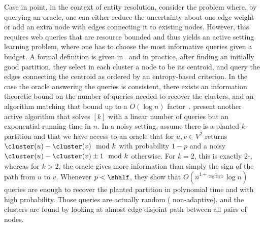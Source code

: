 
Case in point, in the context of entity resolution, \textcite{activeCoref07} consider the \pcc{}
problem where, by querying an oracle, one can either reduce the uncertainty about one edge weight or
add an extra node with edges connecting it to existing nodes. However, this requires web queries
that are resource bounded and thus yields an active setting learning problem, where one has to
choose the most informative
queries given a budget. A formal definition is given in~\autocite{queryMoreEdgeCC07} and in
practice, after finding an initially good partition, they select in each cluster a node to be its
centroid, and query the edges connecting the centroid as ordered by an entropy-based criterion.
In the case the oracle answering the queries is consistent, there exists an information
theoretic bound on the number of queries needed to recover the clusters, and an algorithm matching
that bound up to a $O(\log n)$ factor~\autocite{perfectActiveLong17}.
\textcite[Section 5]{Ailon2014} present another active algorithm that solves \mind$[k]$ with a
linear number of queries but an exponential running time in $n$.  In a noisy setting,
\textcite{Mitzenmacher2016} assume there is a planted $k$-partition and that we have access to an
oracle that for $u,v\in V^2$ returns $\cluster(u) - \cluster(v) \mod k$ with probability $1-p$ and a
noisy $\cluster(u) - \cluster(v) \pm 1 \mod k$ otherwise. For $k=2$, this is exactly $2$-\pcc{},
whereas for $k>2$, the oracle gives more information than simply the sign of the path from $u$ to
$v$. Whenever
$p < \shalf$, they show that $O(n^{1+\frac{1}{\log\log n}}\log n)$ queries are enough to recover
the planted partition in polynomial time and with high probability. Those queries are actually
random (\ie{} non-adaptive), and the clusters are found by looking at almost edge-disjoint path
between all pairs of nodes.

